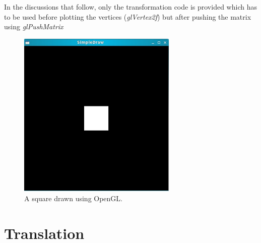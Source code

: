 \documentclass[a4paper,12pt,titlepage,twosided]{article}
\begin{document}
	In the discussions that follow, only the transformation code is provided which has to be used before plotting the vertices (\emph{glVertex2f}) but after pushing the matrix using \emph{glPushMatrix}
	\begin{figure}
		\centering
		\includegraphics[height=80mm]{Images_final/Square.jpg}
		\caption{A square drawn using OpenGL.}
		\label{fig:simple_square}
	\end{figure}
	
\pagebreak
\section{Translation}
\end{document}
